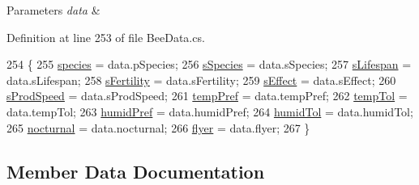 \begin{DoxyParams}{Parameters}
{\em data} & \\
\hline
\end{DoxyParams}


Definition at line 253 of file Bee\+Data.\+cs.


\begin{DoxyCode}
254         \{
255             \hyperlink{struct_bee_game_1_1_bee_1_1_combining_bee_data_a7e519ea913d51073b7da7815e85a4eeb}{species} = data.pSpecies;
256             \hyperlink{struct_bee_game_1_1_bee_1_1_combining_bee_data_a8359d180e7a0704e81bb7f37b9aac021}{sSpecies} = data.sSpecies;
257             \hyperlink{struct_bee_game_1_1_bee_1_1_combining_bee_data_a2635fae2aa8e50991d7733624883e671}{sLifespan} = data.sLifespan;
258             \hyperlink{struct_bee_game_1_1_bee_1_1_combining_bee_data_a02566c65413bebc23e767561c17510d5}{sFertility} = data.sFertility;
259             \hyperlink{struct_bee_game_1_1_bee_1_1_combining_bee_data_a6706a04242c477e5934d779fde7e7b8e}{sEffect} = data.sEffect;
260             \hyperlink{struct_bee_game_1_1_bee_1_1_combining_bee_data_a253d2a55fe2cb1a3d01492a6f961b995}{sProdSpeed} = data.sProdSpeed;
261             \hyperlink{struct_bee_game_1_1_bee_1_1_combining_bee_data_a93f8cb5caf0b68dd597da1b3ab9e27b5}{tempPref} = data.tempPref;
262             \hyperlink{struct_bee_game_1_1_bee_1_1_combining_bee_data_a31cebfaca3139379e30a43fa0ac7e338}{tempTol} = data.tempTol;
263             \hyperlink{struct_bee_game_1_1_bee_1_1_combining_bee_data_ab9a9a9623d942632f8007711b65f909e}{humidPref} = data.humidPref;
264             \hyperlink{struct_bee_game_1_1_bee_1_1_combining_bee_data_a98c56c89bcd5f983b4d022c113f789e3}{humidTol} = data.humidTol;
265             \hyperlink{struct_bee_game_1_1_bee_1_1_combining_bee_data_a337800df462a764c58328d21d2398d6c}{nocturnal} = data.nocturnal;
266             \hyperlink{struct_bee_game_1_1_bee_1_1_combining_bee_data_ac0af7556cf90035ff830a6e121e8d4c4}{flyer} = data.flyer;
267         \}
\end{DoxyCode}


\subsection{Member Data Documentation}
\mbox{\label{struct_bee_game_1_1_bee_1_1_combining_bee_data_ac0af7556cf90035ff830a6e121e8d4c4}} 

